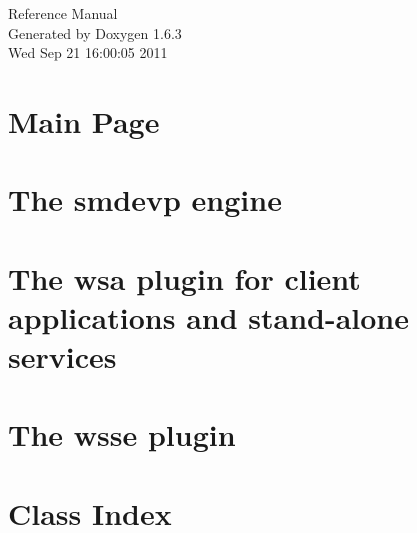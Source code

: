 \documentclass[a4paper]{book}
\begin{document}
\hypersetup{pageanchor=false}
\begin{titlepage}
\vspace*{7cm}
\begin{center}
{\Large Reference Manual}\\
\vspace*{1cm}
{\large Generated by Doxygen 1.6.3}\\
\vspace*{0.5cm}
{\small Wed Sep 21 16:00:05 2011}\\
\end{center}
\end{titlepage}
\clearemptydoublepage
{}
\tableofcontents
\clearemptydoublepage
{}
\hypersetup{pageanchor=true}
\chapter{Main Page}
\label{index}\hypertarget{index}{}
\chapter{The smdevp engine}
\label{smdevp}
\hypertarget{smdevp}{}

\chapter{The wsa plugin for client applications and stand-\/alone services}
\label{wsa_0}
\hypertarget{wsa_0}{}

\chapter{The wsse plugin}
\label{wsse}
\hypertarget{wsse}{}

\chapter{Class Index}

\end{document}
